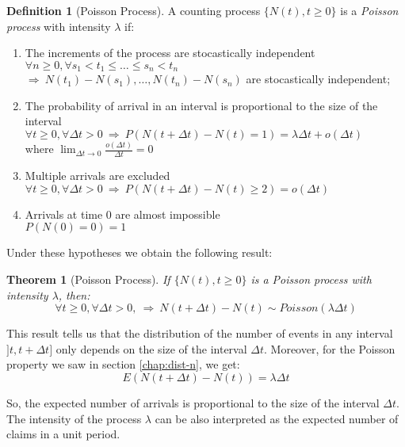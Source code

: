 \documentclass[a4paper, twoside, openright, 12pt]{report}
\newcommand\omicron{o}
\newtheorem{theorem}{Theorem}[chapter]
\theoremstyle{definition}
\newtheorem{definition}{Definition}[chapter]
\theoremstyle{definition}
\theoremstyle{definition}
\theoremstyle{remark}
\begin{document}
\begin{definition}[Poisson Process]
\label{def:def-process-poisson} \iffalse (Poisson Process) \fi{} A counting process \(\{N(t), t\ge0\}\) is a \textit{Poisson process} with intensity \(\lambda\) if:

\begin{enumerate}
\item The increments of the process are stocastically independent \\
      $\forall n\ge0, \forall s_1 < t_1 \le \dots \le s_n < t_n$ \\
      $\Rightarrow \ N(t_1)-N(s_1), \dots, N(t_n)-N(s_n)$ are stocastically independent;
\item The probability of arrival in an interval is proportional to the size of the interval \\
      $\forall t\ge 0, \forall \Delta t >0 \ \Rightarrow \ P\left( N(t + \Delta t) - N(t) = 1 \right) = \lambda \Delta t + \omicron (\Delta t)$ \\
      where $\lim_{\Delta t \to 0}{\frac{\omicron(\Delta t)}{\Delta t}} = 0$
\item Multiple arrivals are excluded \\
      $\forall t\ge 0, \forall \Delta t >0 \ \Rightarrow \ P\left( N(t + \Delta t) - N(t) \ge 2 \right) = \omicron (\Delta t)$
\item Arrivals at time $0$ are almost impossible \\
      $P\left( N(0) = 0 \right) = 1 $
\end{enumerate}
\end{definition}

Under these hypotheses we obtain the following result:

\begin{theorem}[Poisson Process]
\label{thm:th-process-poisson} \iffalse (Poisson Process) \fi{} If \(\{N(t), t\ge 0 \}\) is a Poisson process with intensity \(\lambda\), then:
\[\forall t\ge 0, \forall \Delta t >0, \ \Rightarrow \ N(t + \Delta t) - N(t) \sim Poisson(\lambda \Delta t)\]
\end{theorem}

This result tells us that the distribution of the number of events in any interval \(]t, t+\Delta t]\) only depends on the size of the interval \(\Delta t\). Moreover, for the Poisson property we saw in section \ref{chap:dist-n}, we get:
\[E(N(t + \Delta t) - N(t)) = \lambda \Delta t\]

So, the expected number of arrivals is proportional to the size of the interval \(\Delta t\). The intensity of the process \(\lambda\) can be also interpreted as the expected number of claims in a unit period.
\end{document}
